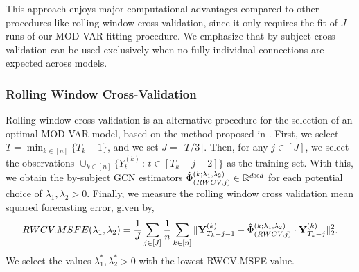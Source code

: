 This approach enjoys major computational advantages compared to other procedures like rolling-window cross-validation, since it only requires the fit of $J$ runs of our MOD-VAR fitting procedure. We emphasize that by-subject cross validation can be used exclusively when no fully individual connections are expected across models. %


\subsubsection{Rolling Window Cross-Validation}

Rolling window cross-validation is an alternative procedure for the selection of an optimal MOD-VAR model, based on the method proposed in \citep{nicholson2017varx}. First, we select $T =  \min_{k\in[n]}\{ T_k-1 \}$, and we set $J = \lfloor  T / 3 \rfloor$. Then, for any $j \in [J]$, we select the observations $\cup_{k\in[n]}\{Y^{(k)}_{t}\,:\, t\in [T_k - j - 2]\}$ as the training set. With this, we obtain the by-subject GCN estimators $\hat\Phi^{(k;\lambda_1,\lambda_2)}_{(RWCV,j)}\in\mathbb{R}^{d\times d}$ for each potential choice of $\lambda_1,\lambda_2> 0$. Finally, we measure the rolling window cross validation mean squared forecasting error, given by,
\begin{equation*}
	RWCV.MSFE(\lambda_1, \lambda_2) = \frac{1}{J}\sum_{j\in[J]} \frac{1}{n} \sum_{k\in[n]}\| \mathbf{Y}^{(k)}_{T_k - j - 1} -  \hat\Phi^{(k;\lambda_1,\lambda_2)}_{(RWCV,j)} \cdot \mathbf{Y}^{(k)}_{T_k - j} \|_2^2.
\end{equation*}
We select the values  $\lambda_1^*, \lambda_2^*>0$ with the lowest RWCV.MSFE value. 

